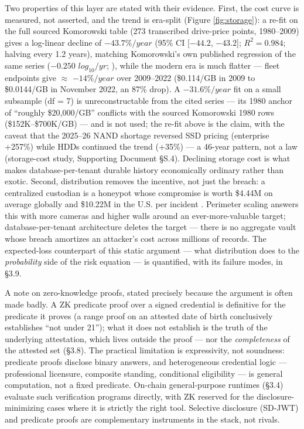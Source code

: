 \documentclass[11pt,twocolumn]{article}
\begin{document}
Two properties of this layer are stated with their evidence. First, the
cost curve is measured, not asserted, and the trend is era-split (Figure
\ref{fig:storage}): a re-fit on the full sourced Komorowski table
\citep{komorowski2024} (273 transcribed drive-price points, 1980--2009)
gives a log-linear decline of \(-43.7\%/year\) (95\% CI {[}\(-44.2\),
\(-43.2\){]}; \(R^{2} = 0.984\); halving every 1.2 years), matching
Komorowski's own published regression of the same series (\(-0.250\)
\(log_{10}/yr\); \citealp{komorowski2024}), while the modern era is much
flatter --- \citeauthor{backblaze2022} fleet endpoints give \(\approx\)
\(-14\%/year\) over 2009--2022 (\$0.114/GB in 2009 to \$0.0144/GB in
November 2022, an 87\% drop). A \(-31.6\%/year\) fit on a
small subsample (df = 7) is unreconstructable from the cited series --- its
1980 anchor of ``roughly \$20,000/GB'' conflicts with the sourced
Komorowski 1980 rows (\$152K--\$700K/GB) --- and is not used; the re-fit
above is the claim, with the caveat that the 2025--26 NAND shortage reversed
SSD pricing (enterprise +257\%) while HDDs continued the trend (+35\%)
--- a 46-year pattern, not a law (storage-cost study, Supporting
Document §S.4). Declining storage cost is what makes database-per-tenant
durable history economically ordinary rather than exotic. Second,
distribution removes the incentive, not just the breach: a centralized
custodian is a honeypot whose compromise is worth \$4.44M on average
globally and \$10.22M in the U.S. per incident
\citep[customer PII present in 53\% of breaches]{ibm2025}. Perimeter
scaling answers this with more cameras and higher walls around an
ever-more-valuable target; database-per-tenant architecture deletes the
target --- there is no aggregate vault whose breach amortizes an
attacker's cost across millions of records. The expected-loss
counterpart of this static argument --- what distribution does to the
\emph{probability} side of the risk equation --- is quantified, with its
failure modes, in §3.9.

A note on zero-knowledge proofs, stated precisely because the argument
is often made badly. A ZK predicate proof over a signed credential is
definitive for the predicate it proves (a range proof on an attested
date of birth conclusively establishes ``not under 21''); what it does
not establish is the truth of the underlying attestation, which lives
outside the proof --- nor the \emph{completeness} of the attested set
(§3.8). The practical limitation is expressivity, not soundness:
predicate proofs disclose binary answers, and heterogeneous credential
logic --- professional licensure, composite standing, conditional
eligibility --- is general computation, not a fixed predicate. On-chain
general-purpose runtimes (§3.4) evaluate such verification programs
directly, with ZK reserved for the disclosure-minimizing cases where it
is strictly the right tool. Selective disclosure (SD-JWT) and predicate
proofs are complementary instruments in the stack, not rivals.
\end{document}
